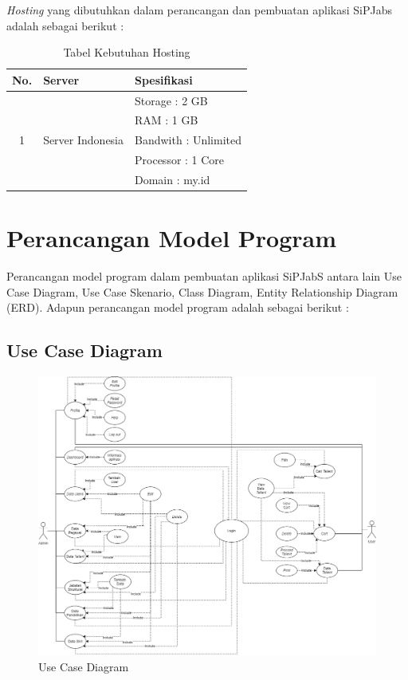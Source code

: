 \textit{Hosting} yang dibutuhkan dalam perancangan dan pembuatan aplikasi SiPJabs
adalah sebagai berikut :

\begin{table}[H]
	\centering
	\caption{Tabel Kebutuhan Hosting}
	\begin{tabular}{ | c | l | l | }
		\hline
		No. & Server & Spesifikasi \\
		\hline
		\multirow{5}{*}{1} & \multirow{5}{*}{Server Indonesia} & Storage : 2 GB \\
		& & RAM : 1 GB \\
		& & Bandwith : Unlimited \\
		& & Processor : 1 Core \\
		& & Domain : my.id  \\
	
		\hline
	\end{tabular}
\end{table}

\section{Perancangan Model Program}
Perancangan model program dalam pembuatan aplikasi SiPJabS antara
lain Use Case Diagram, Use Case Skenario, Class Diagram,
Entity Relationship Diagram (ERD). Adapun perancangan model program adalah sebagai berikut :

\subsection{Use Case Diagram}

\begin{figure}
	\centering
	\includegraphics[width=1\textwidth]
	{pics/diagram/usecase.png}
	\caption{Use Case Diagram}
	\label{fig:32}
\end{figure}


